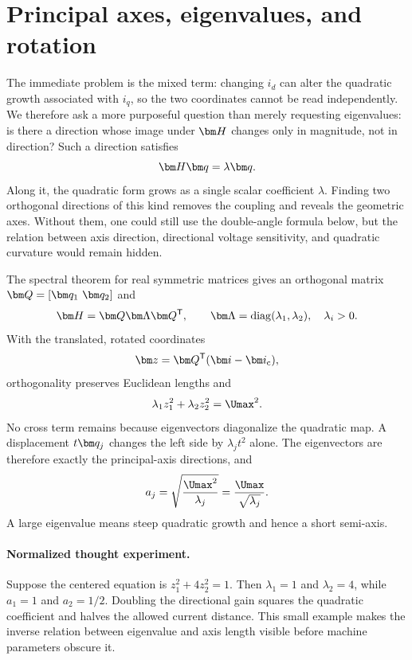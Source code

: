 \section{Principal axes, eigenvalues, and rotation}

The immediate problem is the mixed term: changing $i_d$ can alter the
quadratic growth associated with $i_q$, so the two coordinates cannot be read
independently.  We therefore ask a more purposeful question than merely
requesting eigenvalues: is there a direction whose image under $\Hpsm$ changes
only in magnitude, not in direction?  Such a direction satisfies
\begin{equation}
 \Hpsm\vect q=\lambda\vect q.
\end{equation}
Along it, the quadratic form grows as a single scalar coefficient
$\lambda$.  Finding two orthogonal directions of this kind removes the
coupling and reveals the geometric axes.  Without them, one could still use
the double-angle formula below, but the relation between axis direction,
directional voltage sensitivity, and quadratic curvature would remain hidden.

The spectral theorem for real symmetric matrices gives an orthogonal matrix
$\matr Q=[\vect q_1\ \vect q_2]$ and
\begin{equation}
 \Hpsm=\matr Q\matr\Lambda\matr Q\trans,
 \qquad \matr\Lambda=\diag(\lambda_1,\lambda_2),\quad\lambda_i>0.
\end{equation}
With the translated, rotated coordinates
\begin{equation}
 \vect z=\matr Q\trans(\current-\ic),\label{eq:principal-coordinates}
\end{equation}
orthogonality preserves Euclidean lengths and
\begin{equation}
 \lambda_1z_1^2+\lambda_2z_2^2=\Umax^2.\label{eq:principal-ellipse}
\end{equation}
No cross term remains because eigenvectors diagonalize the quadratic map.  A
displacement $t\vect q_j$ changes the left side by $\lambda_jt^2$ alone.  The
eigenvectors are therefore exactly the principal-axis directions, and
\begin{equation}
 a_j=\sqrt{\frac{\Umax^2}{\lambda_j}}=
 \frac{\Umax}{\sqrt{\lambda_j}}.\label{eq:semiaxes}
\end{equation}
A large eigenvalue means steep quadratic growth and hence a short semi-axis.

\paragraph{Normalized thought experiment.}
Suppose the centered equation is
$z_1^2+4z_2^2=1$.  Then $\lambda_1=1$ and $\lambda_2=4$, while
$a_1=1$ and $a_2=1/2$.  Doubling the directional gain squares the
quadratic coefficient and halves the allowed current distance.  This small
example makes the inverse relation between eigenvalue and axis length visible
before machine parameters obscure it.

